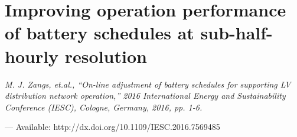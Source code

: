 \chapter{Improving operation performance of battery schedules at sub-half-hourly resolution}
\label{ch1}

\singlespacing
\epigraph{\textit{M. J. Zangs, et.al., ``On-line adjustment of battery schedules for supporting LV distribution network operation,'' 2016 International Energy and Sustainability Conference (IESC), Cologne, Germany, 2016, pp. 1-6.}}{--- Available: http://dx.doi.org/10.1109/IESC.2016.7569485}
\doublespacing












